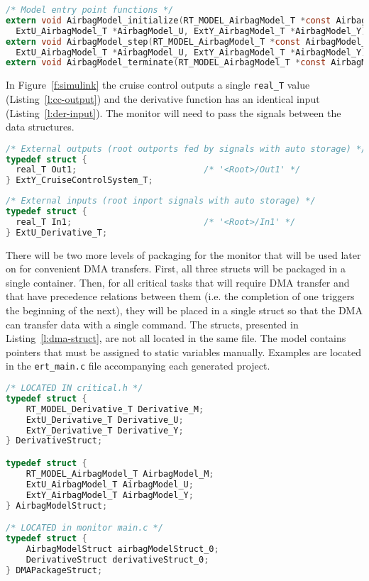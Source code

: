 \begin{lstlisting}[caption={Airbag model function declarations},label=l:airbag-proto,language=C]
/* Model entry point functions */
extern void AirbagModel_initialize(RT_MODEL_AirbagModel_T *const AirbagModel_M,
  ExtU_AirbagModel_T *AirbagModel_U, ExtY_AirbagModel_T *AirbagModel_Y);
extern void AirbagModel_step(RT_MODEL_AirbagModel_T *const AirbagModel_M,
  ExtU_AirbagModel_T *AirbagModel_U, ExtY_AirbagModel_T *AirbagModel_Y);
extern void AirbagModel_terminate(RT_MODEL_AirbagModel_T *const AirbagModel_M);
\end{lstlisting}

In Figure~\ref{f:simulink} the cruise control outputs a single \texttt{real\_T} value (Listing~\ref{l:cc-output}) and the derivative function has an identical input (Listing~\ref{l:der-input}). The monitor will need to pass the signals between the data structures.
\begin{lstlisting}[caption={Cruise control output struct definition},label=l:cc-output,language=C]
/* External outputs (root outports fed by signals with auto storage) */
typedef struct {
  real_T Out1;                         /* '<Root>/Out1' */
} ExtY_CruiseControlSystem_T;
\end{lstlisting}

\begin{lstlisting}[caption={Derivative input struct definition},label=l:der-input,language=C]
/* External inputs (root inport signals with auto storage) */
typedef struct {
  real_T In1;                          /* '<Root>/In1' */
} ExtU_Derivative_T;
\end{lstlisting}

There will be two more levels of packaging for the monitor that will be used later on for convenient DMA transfers. First, all three structs will be packaged in a single container. Then, for all critical tasks that will require DMA transfer and that have precedence relations between them (i.e. the completion of one triggers the beginning of the next), they will be placed in a single struct so that the DMA can transfer data with a single command. The structs, presented in Listing~\ref{l:dma-struct}, are not all located in the same file. The model contains pointers that must be assigned to static variables manually. Examples are located in the \texttt{ert\_main.c} file accompanying each generated project.

\begin{lstlisting}[caption={Structures of structures to facilitate DMA transfer.},label=l:dma-struct,language=C]
/* LOCATED IN critical.h */
typedef struct {
	RT_MODEL_Derivative_T Derivative_M;
	ExtU_Derivative_T Derivative_U;
	ExtY_Derivative_T Derivative_Y;
} DerivativeStruct;

typedef struct {
	RT_MODEL_AirbagModel_T AirbagModel_M;
	ExtU_AirbagModel_T AirbagModel_U;
	ExtY_AirbagModel_T AirbagModel_Y;
} AirbagModelStruct;

/* LOCATED in monitor main.c */
typedef struct {
	AirbagModelStruct airbagModelStruct_0;
	DerivativeStruct derivativeStruct_0;
} DMAPackageStruct;
\end{lstlisting}